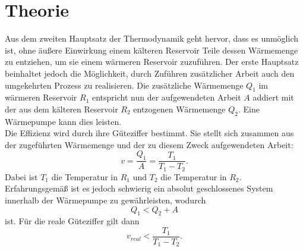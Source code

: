 \section{Theorie}
\label{sec:Theorie}
Aus dem zweiten Hauptsatz der Thermodynamik geht hervor, dass es unmöglich ist, ohne äußere Einwirkung einem kälteren Reservoir Teile dessen Wärmemenge zu entziehen, um sie einem wärmeren Reservoir zuzuführen.
Der erste Hauptsatz beinhaltet jedoch die Möglichkeit, durch Zuführen zusätzlicher Arbeit auch den umgekehrten Prozess zu realisieren.
Die zusätzliche Wärmemenge $ Q_1 $ im wärmeren Reservoir $ R_1 $ entspricht nun der aufgewendeten Arbeit $ A $ addiert mit der aus dem kälteren Reservoir $ R_2 $ entzogenen Wärmemenge $ Q_2 $.
Eine Wärmepumpe kann dies leisten.\\
Die Effizienz wird durch ihre Güteziffer bestimmt.
Sie stellt sich zusammen aus der zugeführten Wärmemenge und der zu diesem Zweck aufgewendeten Arbeit:
\begin{equation}
  v = \frac{Q_1}{A}=\frac{T_1}{T_1-T_2}.
\end{equation}
Dabei ist $ T_1 $ die Temperatur in $R_1$ und $ T_2 $ die Temperatur in $ R_2 $.
Erfahrungsgemäß ist es jedoch schwierig ein absolut geschlossenes System innerhalb der Wärmepumpe zu gewährleisten, wodurch
\begin{equation}
  Q_1 < Q_2 + A
\end{equation}
ist.
Für die reale Güteziffer gilt dann
\begin{equation}
  v_{real} < \frac{T_1}{T_1-T_2}.
\end{equation}
\cite{sample}

